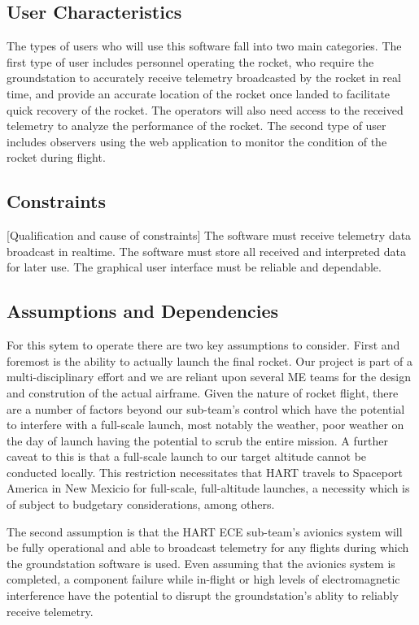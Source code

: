 \documentclass[onecolumn, draftclsnofoot,10pt, compsoc]{IEEEtran}
\begin{document}
		\subsection{User Characteristics}
			The types of users who will use this software fall into two main categories. 
			The first type of user includes personnel operating the rocket, who require the groundstation to accurately receive telemetry broadcasted by the rocket in real time, and provide an accurate location of the rocket once landed to facilitate quick recovery of the rocket.
			The operators will also need access to the received telemetry to analyze the performance of the rocket.
			The second type of user includes observers using the web application to monitor the condition of the rocket during flight.

		\subsection{Constraints}
			[Qualification and cause of constraints]
			The software must receive telemetry data broadcast in realtime.
			The software must store all received and interpreted data for later use.
			The graphical user interface must be reliable and dependable.

		\subsection{Assumptions and Dependencies}
			For this sytem to operate there are two key assumptions to consider.
			First and foremost is the ability to actually launch the final rocket. 
			Our project is part of a multi-disciplinary effort and we are reliant upon several ME teams for the design and constrution of the actual airframe.
			Given the nature of rocket flight, there are a number of factors beyond our sub-team's control which have the potential to interfere with a full-scale launch, most notably the weather, poor weather on the day of launch having the potential to scrub the entire mission.
			A further caveat to this is that a full-scale launch to our target altitude cannot be conducted locally.
			This restriction necessitates that HART travels to Spaceport America in New Mexicio for full-scale, full-altitude launches, a necessity which is of subject to budgetary considerations, among others.

			The second assumption is that the HART ECE sub-team's avionics system will be fully operational and able to broadcast telemetry for any flights during which the groundstation software is used.
			Even assuming that the avionics system is completed, a component failure while in-flight or high levels of electromagnetic interference have the potential to disrupt the groundstation's ablity to reliably receive telemetry.
\end{document}
